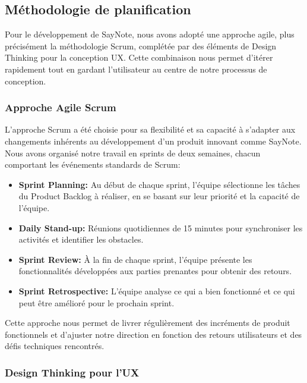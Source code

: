     \subsection{Méthodologie de planification}
    
    Pour le développement de SayNote, nous avons adopté une approche agile, plus précisément la méthodologie Scrum, complétée par des éléments de Design Thinking pour la conception UX. Cette combinaison nous permet d'itérer rapidement tout en gardant l'utilisateur au centre de notre processus de conception.
    
    \subsubsection{Approche Agile Scrum}
    
    L'approche Scrum a été choisie pour sa flexibilité et sa capacité à s'adapter aux changements inhérents au développement d'un produit innovant comme SayNote. Nous avons organisé notre travail en sprints de deux semaines, chacun comportant les événements standards de Scrum:
    
    \begin{itemize}
        \item \textbf{Sprint Planning:} Au début de chaque sprint, l'équipe sélectionne les tâches du Product Backlog à réaliser, en se basant sur leur priorité et la capacité de l'équipe.
        
        \item \textbf{Daily Stand-up:} Réunions quotidiennes de 15 minutes pour synchroniser les activités et identifier les obstacles.
        
        \item \textbf{Sprint Review:} À la fin de chaque sprint, l'équipe présente les fonctionnalités développées aux parties prenantes pour obtenir des retours.
        
        \item \textbf{Sprint Retrospective:} L'équipe analyse ce qui a bien fonctionné et ce qui peut être amélioré pour le prochain sprint.
    \end{itemize}
    
    Cette approche nous permet de livrer régulièrement des incréments de produit fonctionnels et d'ajuster notre direction en fonction des retours utilisateurs et des défis techniques rencontrés.
    
    \subsubsection{Design Thinking pour l'UX}
    
